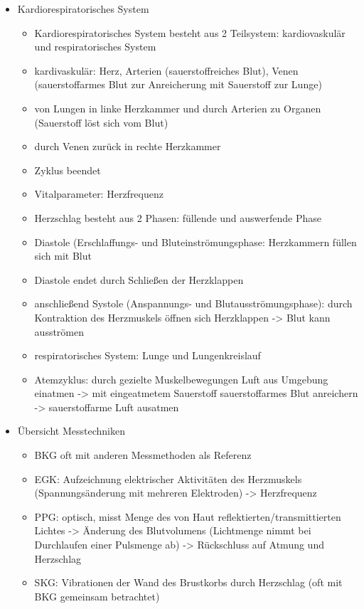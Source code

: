 	\begin{itemize}
		\item Kardiorespiratorisches System
			\begin{itemize}
				\item Kardiorespiratorisches System besteht aus 2 Teilsystem: kardiovaskulär und respiratorisches System
				\item kardivaskulär: Herz, Arterien (sauerstoffreiches Blut), Venen (sauerstoffarmes Blut zur Anreicherung mit Sauerstoff zur Lunge)
				\item von Lungen in linke Herzkammer und durch Arterien zu Organen (Sauerstoff löst sich vom Blut)
				\item durch Venen zurück in rechte Herzkammer
				\item Zyklus beendet
				\item Vitalparameter: Herzfrequenz
				\item Herzschlag besteht aus 2 Phasen: füllende und auswerfende Phase
				\item Diastole (Erschlaffungs- und Bluteinströmungsphase: Herzkammern füllen sich mit Blut
				\item Diastole endet durch Schließen der Herzklappen
				\item anschließend Systole (Anspannungs- und Blutausströmungsphase): durch Kontraktion des Herzmuskels öffnen sich Herzklappen -> Blut kann ausströmen
				\item respiratorisches System: Lunge und Lungenkreislauf
				\item Atemzyklus: durch gezielte Muskelbewegungen Luft aus Umgebung einatmen -> mit eingeatmetem Sauerstoff sauerstoffarmes Blut anreichern -> sauerstoffarme Luft ausatmen
			\end{itemize}
			
		\item Übersicht Messtechniken
			\begin{itemize}
				\item BKG oft mit anderen Messmethoden als Referenz
				\item EGK: Aufzeichnung elektrischer Aktivitäten des Herzmuskels (Spannungsänderung mit mehreren Elektroden) -> Herzfrequenz
				\item PPG: optisch, misst Menge des von Haut reflektierten/transmittierten Lichtes -> Änderung des Blutvolumens (Lichtmenge nimmt bei Durchlaufen einer Pulsmenge ab) -> Rückschluss auf Atmung und Herzschlag
				\item SKG: Vibrationen der Wand des Brustkorbs durch Herzschlag (oft mit BKG gemeinsam betrachtet)
			\end{itemize}
		
	\end{itemize}
	
